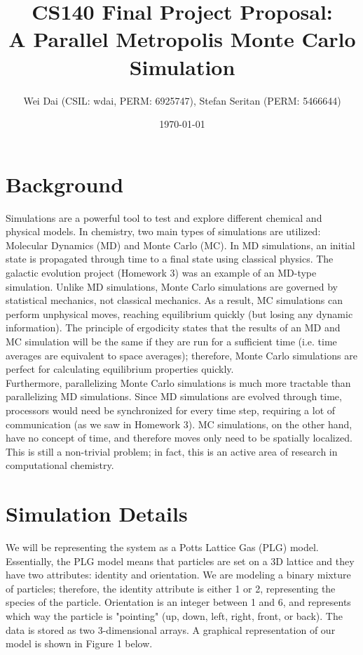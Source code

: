 \documentclass{article}
\author{Wei Dai (CSIL: wdai, PERM: 6925747), Stefan Seritan (PERM: 5466644)}
\date{\today}
\title{CS140 Final Project Proposal:\\A Parallel Metropolis Monte Carlo Simulation}
\begin{document}
\maketitle

\section*{Background}
Simulations are a powerful tool to test and explore different chemical and physical models. In chemistry, two main types of simulations are utilized: Molecular Dynamics (MD) and Monte Carlo (MC). In MD simulations, an initial state is propagated through time to a final state using classical physics. The galactic evolution project (Homework 3) was an example of an MD-type simulation. Unlike MD simulations, Monte Carlo simulations are governed by statistical mechanics, not classical mechanics. As a result, MC simulations can perform unphysical moves, reaching equilibrium quickly (but losing any dynamic information). The principle of ergodicity states that the results of an MD and MC simulation will be the same if they are run for a sufficient time (i.e. time averages are equivalent to space averages); therefore, Monte Carlo simulations are perfect for calculating equilibrium properties quickly.\\
Furthermore, parallelizing Monte Carlo simulations is much more tractable than parallelizing MD simulations. Since MD simulations are evolved through time, processors would need be synchronized for every time step, requiring a lot of communication (as we saw in Homework 3). MC simulations, on the other hand, have no concept of time, and therefore moves only need to be spatially localized. This is still a non-trivial problem; in fact, this is an active area of research in computational chemistry. 

\section*{Simulation Details}
We will be representing the system as a Potts Lattice Gas (PLG) model. Essentially, the PLG model means that particles are set on a 3D lattice and they have two attributes: identity and orientation. We are modeling a binary mixture of particles; therefore, the identity attribute is either 1 or 2, representing the species of the particle. Orientation is an integer between 1 and 6, and represents which way the particle is "pointing" (up, down, left, right, front, or back). The data is stored as two 3-dimensional arrays. A graphical representation of our model is shown in Figure 1 below.
\end{document}
